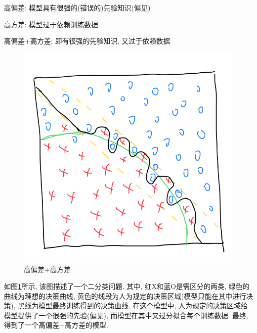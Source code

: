 \documentclass[../main.tex]{subfiles}
\begin{document}
高偏差: 模型具有很强的(错误的)先验知识(偏见)

高方差: 模型过于依赖训练数据

高偏差+高方差: 即有很强的先验知识, 又过于依赖数据

\begin{figure}
    \centering
    \includegraphics[width=.6\textwidth]{../figure/2-8.png}
    \caption{高偏差+高方差}
    \label{img2-8}
\end{figure}

如图\ref{img2-8}所示, 该图描述了一个二分类问题.
其中, 红X和蓝O是需区分的两类, 绿色的曲线为理想的决策曲线,
黄色的线段为人为规定的决策区域(模型只能在其中进行决策),
黑线为模型最终训练得到的决策曲线.
在这个模型中, 人为规定的决策区域给模型提供了一个很强的先验(偏见),
而模型在其中又过分拟合每个训练数据.
最终, 得到了一个高偏差+高方差的模型.
\end{document}
